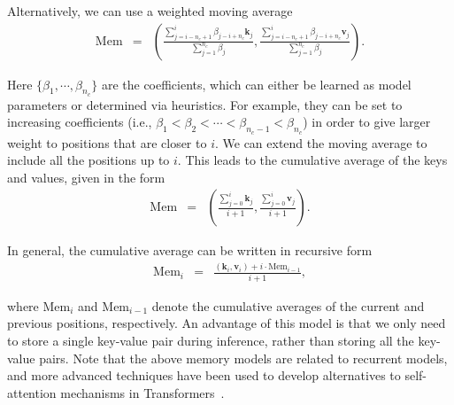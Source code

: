 \begin{itemize}
    Alternatively, we can use a weighted moving average
    \begin{eqnarray}
    \mathrm{Mem} & = & \left( \frac{\sum_{j=i - n_c + 1}^{i} \beta_{j - i + n_c} \mathbf{k}_{j}} {\sum_{j=1}^{n_c} \beta_j} , \frac{\sum_{j=i - n_c + 1}^{i} \beta_{j - i + n_c} \mathbf{v}_{j}}{\sum_{j=1}^{n_c} \beta_j} \right).
    \end{eqnarray}

    \noindent Here $\{\beta_1,\cdots,\beta_{n_c}\}$ are the coefficients, which can either be learned as model parameters or determined via heuristics. For example, they can be set to increasing coefficients (i.e., $\beta_{1} < \beta_{2} < \cdots < \beta_{n_c -1} < \beta_{n_c}$) in order to give larger weight to positions that are closer to $i$. We can extend the moving average to include all the positions up to $i$. This leads to the cumulative average of the keys and values, given in the form
    \begin{eqnarray}
    \mathrm{Mem} & = & \left( \frac{\sum_{j=0}^{i} \mathbf{k}_j}{i+1}, \frac{\sum_{j=0}^{i} \mathbf{v}_j}{i+1} \right).
    \end{eqnarray}

    In general, the cumulative average can be written in recursive form
    \begin{eqnarray}
    \mathrm{Mem}_{i} & = & \frac{(\mathbf{k}_i,\mathbf{v}_i) + i \cdot \mathrm{Mem}_{i-1}}{i + 1},
    \end{eqnarray}

    \noindent where $\mathrm{Mem}_{i}$ and $\mathrm{Mem}_{i-1}$ denote the cumulative averages of the current and previous positions, respectively. An advantage of this model is that we only need to store a single key-value pair during inference, rather than storing all the key-value pairs. Note that the above memory models are related to recurrent models, and more advanced techniques have been used to develop alternatives to self-attention mechanisms in Transformers~\cite{ma-etal:2023mega}.


\end{itemize}
